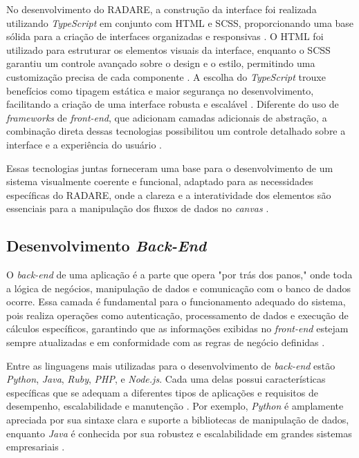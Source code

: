 No desenvolvimento do RADARE, a construção da interface foi realizada utilizando \textit{TypeScript} em conjunto com HTML e SCSS, proporcionando uma base sólida para a criação de interfaces organizadas e responsivas \cite{typescriptbook}. O HTML foi utilizado para estruturar os elementos visuais da interface, enquanto o SCSS garantiu um controle avançado sobre o design e o estilo, permitindo uma customização precisa de cada componente \cite{htmlcssbook}. A escolha do \textit{TypeScript} trouxe benefícios como tipagem estática e maior segurança no desenvolvimento, facilitando a criação de uma interface robusta e escalável \cite{typescriptsecurity}. Diferente do uso de \textit{frameworks} de \textit{front-end}, que adicionam camadas adicionais de abstração, a combinação direta dessas tecnologias possibilitou um controle detalhado sobre a interface e a experiência do usuário \cite{frontendwithoutframework}.

Essas tecnologias juntas forneceram uma base para o desenvolvimento de um sistema visualmente coerente e funcional, adaptado para as necessidades específicas do RADARE, onde a clareza e a interatividade dos elementos são essenciais para a manipulação dos fluxos de dados no \textit{canvas} \cite{frontenddesign}.

\subsection{Desenvolvimento \textit{Back-End}}

O \textit{back-end} de uma aplicação é a parte que opera "por trás dos panos," onde toda a lógica de negócios, manipulação de dados e comunicação com o banco de dados ocorre. Essa camada é fundamental para o funcionamento adequado do sistema, pois realiza operações como autenticação, processamento de dados e execução de cálculos específicos, garantindo que as informações exibidas no \textit{front-end} estejam sempre atualizadas e em conformidade com as regras de negócio definidas \cite{backendroles}.

Entre as linguagens mais utilizadas para o desenvolvimento de \textit{back-end} estão \textit{Python}, \textit{Java}, \textit{Ruby}, \textit{PHP}, e \textit{Node.js}. Cada uma delas possui características específicas que se adequam a diferentes tipos de aplicações e requisitos de desempenho, escalabilidade e manutenção \cite{backendlanguages}. Por exemplo, \textit{Python} é amplamente apreciada por sua sintaxe clara e suporte a bibliotecas de manipulação de dados, enquanto \textit{Java} é conhecida por sua robustez e escalabilidade em grandes sistemas empresariais \cite{javabackend}.

